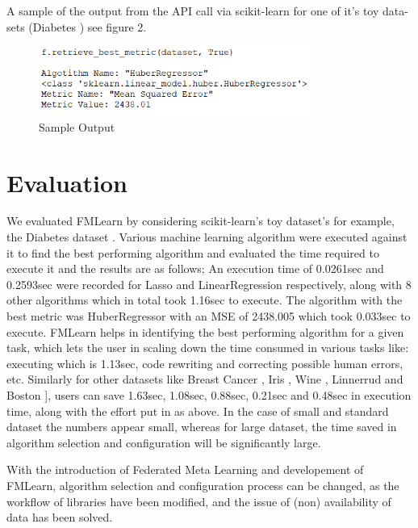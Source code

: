 \documentclass{article}
\begin{document}
A sample of the output from the API call via scikit-learn for one of it's toy data-sets (Diabetes \cite{bradley-et-al}) see figure 2.
\begin{figure}[ht]
    \centering
    \includegraphics[width=3.5in]{sample-output.PNG}
    \caption{Sample Output}
    \label{sample-output}
\end{figure}


\section{Evaluation}
We evaluated FMLearn by considering scikit-learn’s toy dataset’s for example, the Diabetes dataset \cite{bradley-et-al}. Various machine learning algorithm were executed against it to find the best performing algorithm and evaluated the time required to execute it and the results are as follows; An execution time of 0.0261sec and 0.2593sec were recorded for Lasso and LinearRegression respectively, along with 8 other algorithms which in total took 1.16sec to execute. The algorithm with the best metric was HuberRegressor with an MSE of 2438.005 which took 0.033sec to execute. FMLearn helps in identifying the best performing algorithm for a given task, which lets the user in scaling down the time consumed in various tasks like: executing which is 1.13sec, code rewriting and correcting possible human errors, etc. Similarly for other datasets like Breast Cancer \cite{brendan-et-al}, Iris \cite{fisher:r}, Wine \cite{lichman:m}, Linnerrud \cite{tenenhaus:m} and Boston \cite{harrison-et-al}], users can save 1.63sec, 1.08sec, 0.88sec, 0.21sec and 0.48sec in execution time, along with the effort put in as above. In the case of small and standard dataset the numbers appear small, whereas for large dataset, the time saved in algorithm selection and configuration will be significantly large.

With the introduction of Federated Meta Learning and developement of FMLearn, algorithm selection and configuration process can be changed, as the workflow of libraries have been modified, and the issue of (non) availability of data has been solved.
\end{document}
